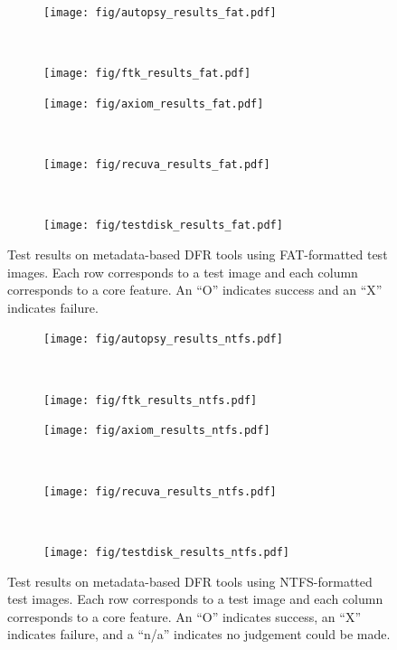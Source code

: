 \begin{figure}
    \centering

    \begin{subfigure}{0.3\linewidth}
        \texttt{[image: fig/autopsy\_results\_fat.pdf]}
    \end{subfigure}~~
    \begin{subfigure}{0.3\linewidth}
        \texttt{[image: fig/ftk\_results\_fat.pdf]}
    \end{subfigure}
    \begin{subfigure}{0.3\linewidth}
        \texttt{[image: fig/axiom\_results\_fat.pdf]}
    \end{subfigure}~~
    \begin{subfigure}{0.3\linewidth}
        \texttt{[image: fig/recuva\_results\_fat.pdf]}
    \end{subfigure}~~
    \begin{subfigure}{0.3\linewidth}
        \texttt{[image: fig/testdisk\_results\_fat.pdf]}
    \end{subfigure}
        
    \caption{Test results on metadata-based DFR tools using FAT-formatted test images. Each row corresponds to a test image and each column corresponds to a core feature. An ``O'' indicates success and an ``X'' indicates failure.}
    \label{fig:results_fat}
\end{figure}

\begin{figure}
    \centering

    \begin{subfigure}{0.3\linewidth}
        \texttt{[image: fig/autopsy\_results\_ntfs.pdf]}
    \end{subfigure}~~
    \begin{subfigure}{0.3\linewidth}
        \texttt{[image: fig/ftk\_results\_ntfs.pdf]}
    \end{subfigure}
    \begin{subfigure}{0.3\linewidth}
        \texttt{[image: fig/axiom\_results\_ntfs.pdf]}
    \end{subfigure}~~
    \begin{subfigure}{0.3\linewidth}
        \texttt{[image: fig/recuva\_results\_ntfs.pdf]}
    \end{subfigure}~~
    \begin{subfigure}{0.3\linewidth}
        \texttt{[image: fig/testdisk\_results\_ntfs.pdf]}
    \end{subfigure}
        
    \caption{Test results on metadata-based DFR tools using NTFS-formatted test images. Each row corresponds to a test image and each column corresponds to a core feature. An ``O'' indicates success, an ``X'' indicates failure, and a ``n/a'' indicates no judgement could be made.}
    \label{fig:results_ntfs}
\end{figure}


